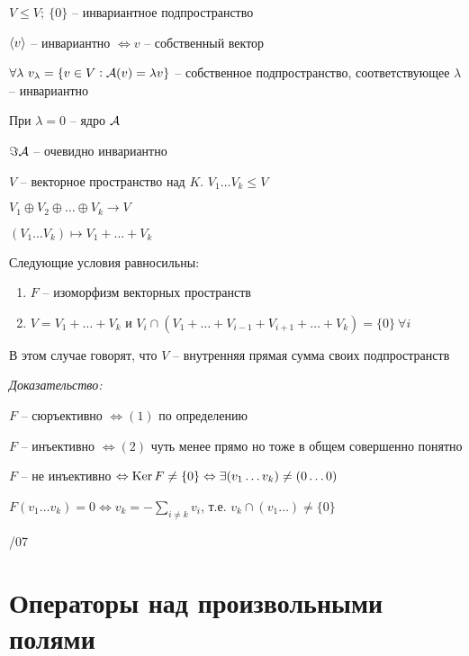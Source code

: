 \documentclass[12pt]{article}
\begin{document}
\begin{Example}{}
    $V \leq V;\ \{0\}$ -- инвариантное подпространство

    $\langle v \rangle$ -- инвариантно $\Leftrightarrow v$ -- собственный вектор

    $\forall \lambda\ v_\lambda = \{v \in V : \mathcal{A}(v) = \lambda v\}$ -- собственное подпространство, соответствующее $\lambda$ -- инвариантно 

    При $\lambda = 0$ -- ядро $\mathcal{A}$

    $\Im \mathcal{A}$ -- очевидно инвариантно
\end{Example}

\begin{Reminder}{}
    $V$ -- векторное пространство над $K$. $V_1 \ldots V_k \leq V$

    $V_1 \oplus V_2 \oplus \ldots \oplus V_k \to V$

    $(V_1 \ldots V_k) \mapsto V_1 + \ldots + V_k$
\end{Reminder}

\begin{theo}{}
    Следующие условия равносильны:

    \begin{enumerate}
        \item $F$ -- изоморфизм векторных пространств 
        \item $V = V_1 + \ldots + V_k$ и $V_i \cap (V_1 + \ldots + V_{i - 1} + V_{i + 1} + \ldots + V_k) = \{0\}\ \forall i$
    \end{enumerate}

    В этом случае говорят, что $V$ -- внутренняя прямая сумма своих подпространств
\end{theo}

\textit{Доказательство:}

$F$ -- сюръективно $\Leftrightarrow (1)$ по определению

$F$ -- инъективно $\Leftrightarrow (2)$ чуть менее прямо но тоже в общем совершенно понятно

$F$ -- не инъективно $\Leftrightarrow \operatorname{Ker} F \neq \{0\} \Leftrightarrow \exists (v_1 \ldots v_k) \neq (0 \ldots 0)$

$F(v_1 \ldots v_k) = 0 \Leftrightarrow v_k = -\sum\limits_{i \neq k} v_i$, т.е. $v_k \cap (v_1 \ldots ) \neq \{0\}$

/07

\section{Операторы над произвольными полями}
\end{document}
